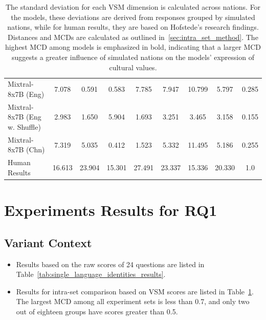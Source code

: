 \documentclass[11pt]{article}
\begin{document}
\begin{table}[hbt]
\begin{tabular}{l|c|c|c|c|c|c|c|c}
\hline
{Mixtral-8x7B (Eng) } & 7.078 & 0.591 & 0.583 & 7.785 & 7.947 & 10.799 & 5.797 & 0.285 \\
{Mixtral-8x7B (Eng w. Shuffle) } & 2.983 & 1.650 & 5.904 & 1.693 & 3.251 & 3.465 & 3.158 & 0.155 \\
{Mixtral-8x7B (Chn) } & 7.319 & 5.035 & 0.412 & 1.523 & 5.332 & 11.495 & 5.186 & 0.255 \\
\hline
{Human Results} & 16.613 & 23.904 & 15.301 & 27.491 & 23.337 & 15.336 & 20.330 & 1.0 \\
\hline
\end{tabular}
\caption{The standard deviation for each VSM dimension is calculated across nations. For the models, these deviations are derived from responses grouped by simulated nations, while for human results, they are based on Hofstede’s research findings. Distances and MCDs are calculated as outlined in~\ref{sec:intra_set_method}. The highest MCD among models is emphasized in bold, indicating that a larger MCD suggests a greater influence of simulated nations on the models' expression of cultural values.}
\label{tab:single_language_vsm_results}
\end{table}

\section{Experiments Results for RQ1}
\label{appendix:RQ1_results}

\subsection{Variant Context}
\begin{itemize}
    \item Results based on the raw scores of 24 questions are listed in Table~\ref{tab:single_language_identities_results}.
    \item Results for intra-set comparison based on VSM scores are listed in Table~\ref{tab:single_language_vsm_results}. The largest MCD among all experiment sets is less than 0.7, and only two out of eighteen groups have scores greater than 0.5.
\end{itemize}
\end{document}
